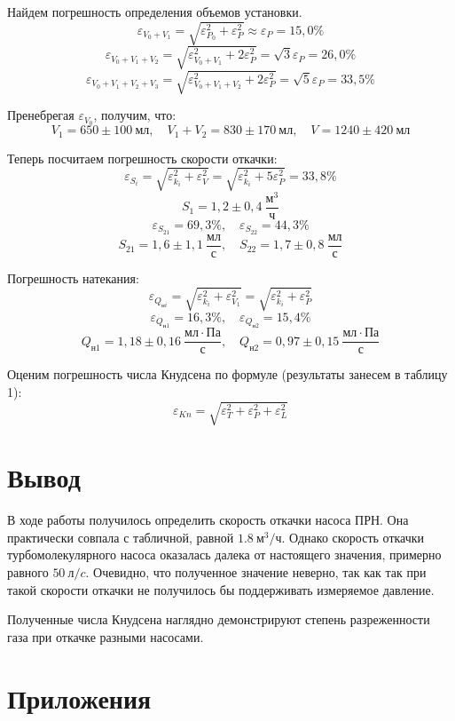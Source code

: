 \documentclass[14pt, a4paper]{report}
\begin{document}
Найдем погрешность определения объемов установки.
\[\varepsilon_{V_0+V_1}=\sqrt{\varepsilon_{P_0}^2+\varepsilon_P^2}\approx\varepsilon_P=15,0\%\]
\[\varepsilon_{V_0+V_1+V_2}=\sqrt{\varepsilon_{V_0+V_1}^2+2\varepsilon_P^2}=\sqrt{3}\varepsilon_P=26,0\%\]
\[\varepsilon_{V_0+V_1+V_2+V_3}=\sqrt{\varepsilon_{V_0+V_1+V_2}^2+2\varepsilon_{P}^2}=\sqrt{5}\varepsilon_P=33,5\%\]

Пренебрегая $\varepsilon_{V_0}$, получим, что:
\[V_1=650\pm100\ мл,\quad V_1+V_2=830\pm170\ мл,\quad V=1240\pm420\ мл\]

Теперь посчитаем погрешность скорости откачки:
\[\varepsilon_{S_i}=\sqrt{\varepsilon_{k_i}^2+\varepsilon_V^2}=\sqrt{\varepsilon_{k_i}^2+5\varepsilon_P^2}=33,8\%\]
\[S_1=1,2\pm0,4\ \frac{м^3}{ч}\]
\[\varepsilon_{S_{21}}=69,3\%, \quad \varepsilon_{S_{22}}=44,3\%\]
\[S_{21}=1,6\pm1,1\ \frac{мл}{с},\quad S_{22}=1,7\pm0,8\ \frac{мл}{с}\]

Погрешность натекания:
\[\varepsilon_{Q_{нi}}=\sqrt{\varepsilon_{k_i}^2+\varepsilon_{V_1}^2}=\sqrt{\varepsilon_{k_i}^2+\varepsilon_P^2}\]
\[\varepsilon_{Q_{н1}}=16,3\%,\quad \varepsilon_{Q_{н2}}=15,4\%\]
\[Q_{н1}=1,18\pm0,16\ \frac{мл\cdot Па}{с},\quad Q_{н2}=0,97\pm0,15\ \frac{мл\cdot Па}{с}\]

Оценим погрешность числа Кнудсена по формуле (результаты занесем в таблицу 1):
\[\varepsilon_{Kn}=\sqrt{\varepsilon_T^2+\varepsilon_P^2+\varepsilon_L^2}\]

\section{Вывод}

В ходе работы получилось определить скорость откачки насоса ПРН. Она практически совпала с табличной, равной $1.8\ м^3/ч$. Однако скорость откачки турбомолекулярного насоса оказалась далека от настоящего значения, примерно равного $50\ л/c$. Очевидно, что полученное значение неверно, так как так при такой скорости откачки не получилось бы поддерживать измеряемое давление.

Полученные числа Кнудсена наглядно демонстрируют степень разреженности газа при откачке разными насосами.

\section{Приложения}
\end{document}
